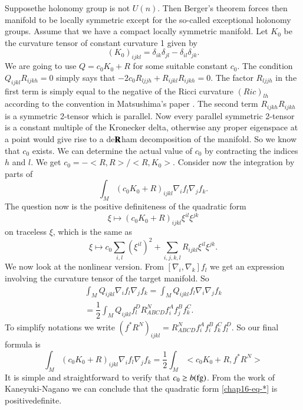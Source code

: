 Suppose\pageoriginale the holonomy group is not $U(n)$. Then Berger's theorem forces then manifold to be locally symmetric except for the so-called exceptional holonomy groups. Assume that we have a compact locally symmetric manifold. Let $K_{0}$ be the curvature tensor of constant curvature 1 given by
$$
(K_{0})_{ijkl}=\delta_{ik}\delta_{jl}-\delta_{il}\delta_{jk}.
$$
We are going to use $Q=c_{0}K_{0} + R$ for some suitable constant $c_{0}$. The condition $Q_{ijkl}R_{ijkh}=0$ simply says that $-2 c_{0}R_{ljjh} + R_{ijkl}R_{ijkh}=0$. The factor $R_{ljjh}$ in the first term is simply equal to the negative of the Ricci curvature $(Ric)_{lh}$ according to the convention in Matsushima's paper \cite{chap16-keyMat}. The second term $R_{ijkh}R_{ijkh}$ is a symmetric 2-tensor which is parallel. Now every parallel symmetric 2-tensor is a constant multiple of the Kronecker delta, otherwise any proper eigenspace at a point would give rise to a de$\mathbf{R}$ham decomposition of the manifold. So we know that $c_{0}$ exists. We can determine the actual value of $c_{0}$ by contracting the indices $h$ and $l$. We get $c_{0}= -< R, R > /< R, K_{0} >$. Consider now the integration by parts of
$$
\int_{M}(c_{0}K_{0}+ R)_{ijkl}\nabla_{i}f_{l}\nabla_{j}f_{k}.
$$
The question now is the positive definiteness of the quadratic form
$$
\xi \mapsto (c_{0}K_{0} + R)_{ijkl}\xi^{il}\xi^{jk}
$$
on traceless $\xi$, which is the same as
\begin{equation}
\xi \mapsto c_{0} \sum\limits_{i,l}(\xi^{il})^{2} + \sum\limits_{i,j,k,l} R_{ijkl}\xi^{il}\xi^{jk}. \tag{$\ast$}\label{chap16-eq-*}
\end{equation}
We now look at the nonlinear version. From $\left[\nabla_{i}, \nabla_{k} \right]f_{l}$ we get an expression involving the curvature tensor of the target manifold. So
\begin{gather*}
\int_{M}Q_{ijkl}\nabla_{i}f_{l} \nabla_{j}f_{k}= \int_{M}Q_{ijkl}f_{l}\nabla_{i}\nabla_{j}f_{k}\\
= \dfrac{1}{2}\int_{M}Q_{ijkl}f_{l}^{D} R_{ABCD}^{N}f_{i}^{A}f_{j}^{B}f_{k}^{C}.
\end{gather*}
To simplify notations we write $(f^{*}R^{N})_{ijkl} =R_{ABCD}^{N}f_{i}^{A}f_{i}^{B}f_{k}^{C}f_{l}^{D}$. So our final formula is
$$
\int_{M}(c_{0}K_{0} + R)_{ijkl} \nabla_{i}f_{l}\nabla_{j}f_{k} = \dfrac{1}{2}\int_{M} < c_{0}K_{0} + R, f^{*}R^{N} >
$$
It is simple and straightforward to verify that $c_{0} \geq b(\operatorname{fg})$. From the work of Kaneyuki-Nagano \cite{chap16-keyK-N} we can conclude that the quadratic form \eqref{chap16-eq-*} is positive\pageoriginale definite.

